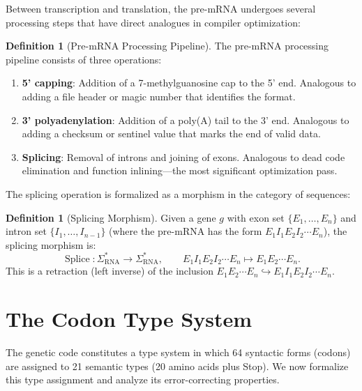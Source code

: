 \documentclass[12pt,a4paper]{article}
\theoremstyle{definition}
\newtheorem{definition}[theorem]{Definition}
\newcommand{\Splice}{\operatorname{Splice}}
\begin{document}
Between transcription and translation, the pre-mRNA undergoes several processing steps that have direct analogues in compiler optimization:

\begin{definition}[Pre-mRNA Processing Pipeline]\label{def:pre-mrna}
The pre-mRNA processing pipeline consists of three operations:
\begin{enumerate}[label=(\alph*)]
  \item \textbf{5' capping}: Addition of a 7-methylguanosine cap to the 5' end. Analogous to adding a file header or magic number that identifies the format.
  \item \textbf{3' polyadenylation}: Addition of a poly(A) tail to the 3' end. Analogous to adding a checksum or sentinel value that marks the end of valid data.
  \item \textbf{Splicing}: Removal of introns and joining of exons. Analogous to dead code elimination and function inlining---the most significant optimization pass.
\end{enumerate}
\end{definition}

The splicing operation is formalized as a morphism in the category of sequences:

\begin{definition}[Splicing Morphism]\label{def:splice-morphism}
Given a gene $g$ with exon set $\{E_1, \ldots, E_n\}$ and intron set $\{I_1, \ldots, I_{n-1}\}$ (where the pre-mRNA has the form $E_1 I_1 E_2 I_2 \cdots E_n$), the splicing morphism is:
\[
  \Splice \colon \Sigma_\mathrm{RNA}^* \to \Sigma_\mathrm{RNA}^*, \qquad
  E_1 I_1 E_2 I_2 \cdots E_n \mapsto E_1 E_2 \cdots E_n.
\]
This is a retraction (left inverse) of the inclusion $E_1 E_2 \cdots E_n \hookrightarrow E_1 I_1 E_2 I_2 \cdots E_n$.
\end{definition}


\section{The Codon Type System}\label{sec:codon-type-system}

The genetic code constitutes a type system in which 64 syntactic forms (codons) are assigned to 21 semantic types (20 amino acids plus Stop). We now formalize this type assignment and analyze its error-correcting properties.
\end{document}
